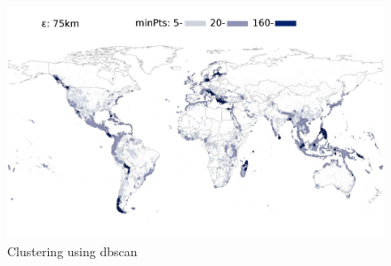 \documentclass[12pt, fullpage,letterpaper]{article}
\begin{document}
	\begin{figure}[h]
		\includegraphics[width=\textwidth]{fig4.jpg}
		\caption{Clustering using dbscan}
	\end{figure}
		
		
	
	
\end{document}
